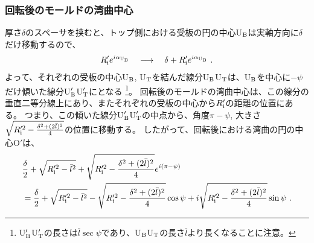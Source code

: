 \subsubsection{回転後のモールドの湾曲中心}
厚さ$\delta$のスペーサを挟むと、トップ側における受板の円の中心U$_\text B$は実軸方向に$\delta$だけ移動するので、
\begin{align*}
  R_\text i'e^{i\alpha_{\text U_\text B}} \quad \longrightarrow \quad \delta+R_\text i'e^{i\alpha_{\text U_\text B}}\ .
\end{align*}
よって、それぞれの受板の中心U$_\text B$, U$_\text T$を結んだ線分U$_\text B$U$_\text T$は、U$_\text B$を中心に$-\psi$だけ傾いた線分U$_\text B'$U$_\text T'$にとなる
\footnote{U$_\text B'$U$_\text T'$の長さは$\bar l\sec\psi$であり、U$_\text B$U$_\text T$の長さ$\bar l$より長くなることに注意。}。
回転後のモールドの湾曲中心は、この線分の垂直二等分線上にあり、またそれぞれの受板の中心から$R_\text i'$の距離の位置にある。
つまり、この傾いた線分U$_\text B'$U$_\text T'$の中点から、角度$\pi-\psi$, 大きさ$\sqrt{R_\text i'^2-\frac{\delta^2+(2\bar l)^2}4}$の位置に移動する。
したがって、回転後における湾曲の円の中心O$'$は、
\begin{align}
  \notag
  & \frac\delta2+\sqrt{R_\text i'^2-\bar l^2}+\sqrt{R_\text i'^2-\frac{\delta^2+(2\bar l)^2}4}e^{i(\pi-\psi)}\\
  & = \frac\delta2+\sqrt{R_\text i'^2-\bar l^2}-\sqrt{R_\text i'^2-\frac{\delta^2+(2\bar l)^2}4}\cos\psi
      +i\sqrt{R_\text i'^2-\frac{\delta^2+(2\bar l)^2}4}\sin\psi\ .
    \label{eq:afterOrgin}
\end{align}


